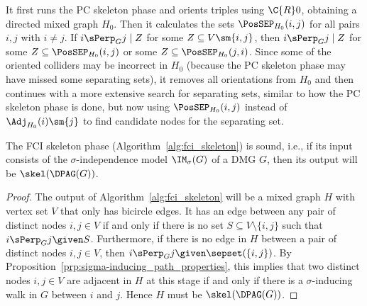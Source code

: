 It first runs the PC skeleton phase and orients triples using $\C{R}0$, obtaining a directed mixed graph $H_0$. 
Then it calculates the sets $\PosSEP_{H_0}(i,j)$ for all pairs $i,j$ with $i \ne j$.
If $i \sPerp_G j \mid Z$ for some $Z \subseteq V \sm \{i,j\}$, then
$i \sPerp_G j \mid Z$ for some $Z \subseteq \PosSEP_{H_0}(i,j)$ or some $Z \subseteq \PosSEP_{H_0}(j,i)$.
Since some of the oriented colliders may be incorrect in $H_0$ (because the PC skeleton phase may have missed some separating sets), it removes all orientations from $H_0$ and then continues with a more extensive search for separating sets, similar
to how the PC skeleton phase is done, but now using $\PosSEP_{H_0}(i,j)$ instead of $\Adj_{H_0}(i)\sm\{j\}$ to find candidate nodes for the separating set.

\begin{Thm}\label{thm:fci_skeleton_sound}
  The FCI skeleton phase (Algorithm~\ref{alg:fci_skeleton}) is sound, i.e., if its input consists of the $\sigma$-independence model $\IM_\sigma(G)$ of a DMG $G$, then its output will be $\skel(\DPAG(G))$.
\end{Thm}
\begin{proof}
  The output of Algorithm~\ref{alg:fci_skeleton} will be a mixed graph $H$ with vertex set $V$ that only has bicircle edges.
  It has an edge between any pair of distinct nodes $i,j \in V$ if and only if there is no set $S \subseteq V \setminus \{i,j\}$ such that $i \sPerp_G j \given S$.
  Furthermore, if there is no edge in $H$ between a pair of distinct nodes $i,j \in V$, then $i \sPerp_G j \given \sepset(\{i,j\})$.
  By Proposition~\ref{prp:sigma-inducing_path_properties}, this implies that two distinct nodes $i,j \in V$ are adjacent in $H$ at this stage if and only if there is a $\sigma$-inducing walk in $G$ between $i$ and $j$.
  Hence $H$ must be $\skel(\DPAG(G))$.
\end{proof}

